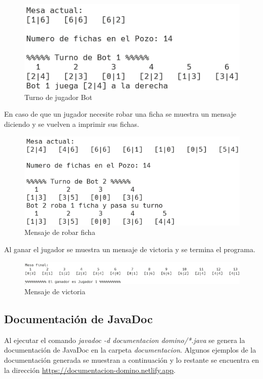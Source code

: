 \documentclass[12pt]{article}
\begin{document}
  \begin{figure}[h!]
    \centering
    \includegraphics{pf4.png}
    \caption{Turno de jugador Bot}
  \end{figure}

  En caso de que un jugador necesite robar una ficha se muestra un mensaje diciendo y se vuelven a imprimir sus fichas.

  \begin{figure}[h!]
    \centering
    \includegraphics{pf5.png}
    \caption{Mensaje de robar ficha} 
  \end{figure}

  Al ganar el jugador se muestra un mensaje de victoria y se termina el programa.

  \begin{figure}[h!]
    \centering
    \includegraphics[scale=0.8]{pf6.png}
    \caption{Mensaje de victoria}
  \end{figure}

  \subsection{Documentación de JavaDoc}
  Al ejecutar el comando \textit{javadoc -d documentacion domino/*.java} se genera la documentación de JavaDoc en la carpeta \textit{documentacion}. Algunos ejemplos de la documentación generada se muestran a continuación y lo restante se encuentra en la dirección \url{https://documentacion-domino.netlify.app}.
\end{document}
